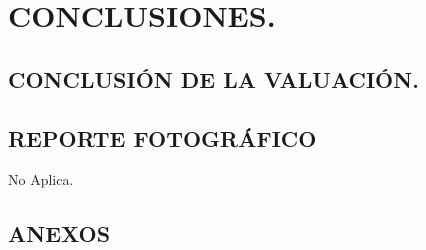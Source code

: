 \documentclass[10pt,letter]{report}
\begin{document}
\espacio{7cm}
\chapter{CONCLUSIONES.}\label{cap:6}
\thispagestyle{fancy}
\setcounter{section}{16}
\section{CONCLUSI\'ON DE LA VALUACI\'ON.}\label{sec:p}




\section{REPORTE FOTOGR\'AFICO}\label{sec:q}
No Aplica.
\section{ANEXOS}\label{sec:r}




\label{lastpage}
\end{document}
